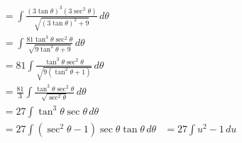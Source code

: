 \documentclass[preview]{standalone}
\begin{document}
\begin{align*}
&= \int \frac{(3\tan\theta)^3(3\sec^2\theta)}{\sqrt{(3\tan\theta)^2+9}} \, d\theta \\ &= \int \frac{81\tan^3\theta\sec^2\theta}{\sqrt{9\tan^2\theta+9}} \, d\theta \\ &= 81\int \frac{\tan^3\theta\sec^2\theta}{\sqrt{9(\tan^2\theta+1)}} \, d\theta \\ &= \frac{81}{3}\int \frac{\tan^3\theta\sec^2\theta}{\sqrt{\sec^2\theta}} \, d\theta \\ &= 27\int \tan^3\theta\sec\theta \, d\theta \\ &= 27\int (\sec^2\theta-1)\sec\theta\tan\theta \, d\theta &=27\int u^2-1 \, du
\end{align*}
\end{document}
